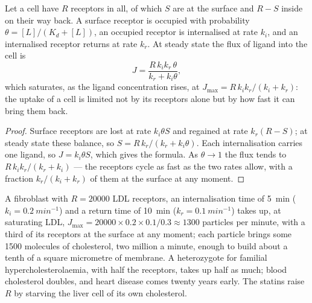 \begin{proposition}\label{prop:b3:membrane-traffic:uptake}
Let a cell have $R$ receptors in all, of which $S$ are at the surface
and $R - S$ inside on their way back. A surface receptor is occupied
with probability $\theta = [L]/(K_{d} + [L])$, an occupied receptor is
internalised at rate $k_{i}$, and an internalised receptor returns at
rate $k_{r}$. At steady state the flux of ligand into the cell is
\[
J = \frac{R\,k_{i}k_{r}\,\theta}{k_{r} + k_{i}\theta},
\]
which saturates, as the ligand concentration rises, at $J_{\max} =
R\,k_{i}k_{r}/(k_{i} + k_{r})$: the uptake of a cell is limited not by
its receptors alone but by how fast it can bring them back.
\end{proposition}
\begin{proof}
Surface receptors are lost at rate $k_{i}\theta S$ and regained at rate
$k_{r}(R - S)$; at steady state these balance, so $S = R\,k_{r}/(k_{r}
+ k_{i}\theta)$. Each internalisation carries one ligand, so $J =
k_{i}\theta S$, which gives the formula. As $\theta \to 1$ the flux
tends to $R\,k_{i}k_{r}/(k_{r} + k_{i})$ --- the receptors cycle as fast
as the two rates allow, with a fraction $k_{r}/(k_{i} + k_{r})$ of them
at the surface at any moment.
\end{proof}

\begin{example}\label{ex:b3:membrane-traffic:ldl}
A fibroblast with $R = \num{20000}$ LDL receptors, an internalisation
time of \qty{5}{min} ($k_{i} = \qty{0.2}{min^{-1}}$) and a return time
of \qty{10}{min} ($k_{r} = \qty{0.1}{min^{-1}}$) takes up, at saturating
LDL, $J_{\max} = \num{20000}\times 0.2\times 0.1/0.3 \approx 1300$
particles per minute, with a third of its receptors at the surface at
any moment; each particle brings some \num{1500} molecules of
cholesterol, two million a minute, enough to build about a tenth of a
square micrometre of membrane. A heterozygote for familial
hypercholesterolaemia, with half the receptors, takes up half as much;
blood cholesterol doubles, and heart disease comes twenty years early.
The statins raise $R$ by starving the liver cell of its own
cholesterol.
\end{example}


